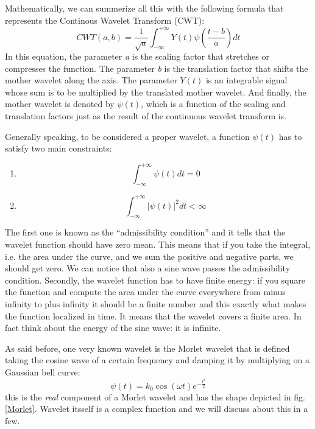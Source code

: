 \documentclass[12pt,a4paper]{report}
\begin{document}
Mathematically, we can summerize all this with the following formula that represents the Continous Wavelet Transform (CWT):
\begin{equation}\label{CWT}
 CWT(a,b) = \frac{1}{\sqrt{a}}\int_{-\infty}^{+\infty} Y(t)\psi\left(\frac{t-b}{a}\right)dt 
\end{equation}
In this equation, the parameter \emph{a} is the scaling factor that stretches or compresses the function. The parameter \emph{b} is the translation factor that shifts the mother wavelet along the axis. The parameter $Y(t)$ is an integrable signal whose sum is to be multiplied by the translated mother
wavelet. And finally, the mother wavelet is denoted by $\psi(t)$, which is a function of the scaling and translation factors just as the result of the continuous wavelet transform is.


Generally speaking, to be considered a proper wavelet, a function $\psi(t)$ has to satisfy two main constraints:
\begin{enumerate}
 \item \begin{equation}
        \int_{-\infty}^{+\infty}  \psi(t)dt = 0
       \end{equation}
 \item \begin{equation}
        \int_{-\infty}^{+\infty}  |\psi(t)|^{2}dt <  \infty
       \end{equation}
\end{enumerate}
The first one is known as the ``admissibility condition'' and it tells that the wavelet function should have zero mean. This means that if you take the integral, i.e. the area under the curve, and we sum the positive and negative parts, we should get zero. We can notice that also a sine wave passes the admissibility condition. Secondly, the wavelet function has to have finite energy: if you square the function and compute the area under the curve everywhere from minus infinity to plus infinity it should be a finite number and this exactly what makes the function localized in time. It means that the wavelet covers a finite area. In fact think about the energy of the sine wave: it is infinite.

As said before, one very known wavelet is the Morlet wavelet that is defined taking the cosine wave of a certain frequency and damping it by multiplying on a Gaussian bell curve:
\begin{equation}\label{MorletEquationFormula}
 \psi(t) = k_{0}\cos(\omega t)e^{-\frac{t^{2}}{2}}
\end{equation}
this is the \emph{real} component of a Morlet wavelet and has the shape depicted in fig. \ref{Morlet}. Wavelet itsself is a complex function and we will discuss about this in a few.
\end{document}
